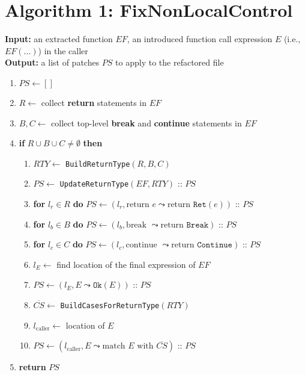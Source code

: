 \documentclass{article}
\begin{document}
\section{Algorithm 1: FixNonLocalControl}

\textbf{Input:} an extracted function $EF$, an introduced function call
expression $E$ (i.e., $EF(\dots)$) in the caller \\
\textbf{Output:} a list of patches $PS$ to apply to the refactored file

\begin{enumerate}
    \item $PS \leftarrow []$
    \item $R \leftarrow$ collect \textbf{return} statements in $EF$
    \item $B, C \leftarrow$ collect top-level \textbf{break} and \textbf{continue} statements in $EF$
    \item \textbf{if} $R \cup B \cup C \neq \emptyset$ \textbf{then}
    \begin{enumerate}
        \item $RTY \leftarrow$ \texttt{BuildReturnType}$(R, B, C)$
        \item $PS \leftarrow$ \texttt{UpdateReturnType}$(EF, RTY)$ :: $PS$
        \item \textbf{for} $l_r \in R$ \textbf{do} $PS \leftarrow (l_r, \text{return } e  \leadsto \text{return } \texttt{Ret}(e))$ :: $PS$
        \item \textbf{for} $l_b \in B$ \textbf{do} $PS \leftarrow (l_b, \text{break } \leadsto \text{return } \texttt{Break})$ :: $PS$
        \item \textbf{for} $l_c \in C$ \textbf{do} $PS \leftarrow (l_c, \text{continue } \leadsto \text{return } \texttt{Continue})$ :: $PS$
        \item $l_E \leftarrow$ find location of the final expression of $EF$
        \item $PS \leftarrow (l_E, E \leadsto \texttt{Ok}(E))$ :: $PS$
        \item $\overline{CS} \leftarrow$ \texttt{BuildCasesForReturnType}$(RTY)$
        \item $l_\text{caller} \leftarrow$ location of $E$
        \item $PS \leftarrow (l_\text{caller}, E \leadsto \text{match } E \text{ with } \overline{CS})$ :: $PS$
    \end{enumerate}
    \item \textbf{return} $PS$
\end{enumerate}
\end{document}
